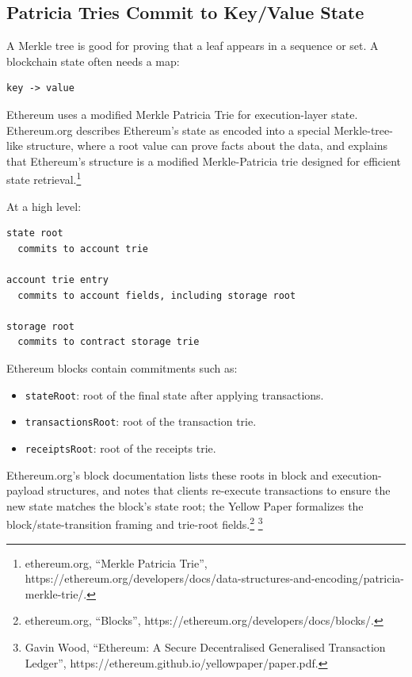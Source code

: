 \subsection{Patricia Tries Commit to Key/Value State}

A Merkle tree is good for proving that a leaf appears in a sequence or
set. A blockchain state often needs a map:

\begin{lstlisting}
key -> value
\end{lstlisting}

Ethereum uses a modified Merkle Patricia Trie for execution-layer state.
Ethereum.org describes Ethereum's state as encoded into a special
Merkle-tree-like structure, where a root value can prove facts about the
data, and explains that Ethereum's structure is a modified
Merkle-Patricia trie designed for efficient state retrieval.\footnote{ethereum.org,
  ``Merkle Patricia Trie'',
  https://ethereum.org/developers/docs/data-structures-and-encoding/patricia-merkle-trie/.}

At a high level:

\begin{lstlisting}
state root
  commits to account trie

account trie entry
  commits to account fields, including storage root

storage root
  commits to contract storage trie
\end{lstlisting}

Ethereum blocks contain commitments such as:

\begin{itemize}
\tightlist
\item
  \passthrough{\lstinline!stateRoot!}: root of the final state after
  applying transactions.
\item
  \passthrough{\lstinline!transactionsRoot!}: root of the transaction
  trie.
\item
  \passthrough{\lstinline!receiptsRoot!}: root of the receipts trie.
\end{itemize}

Ethereum.org's block documentation lists these roots in block and
execution-payload structures, and notes that clients re-execute
transactions to ensure the new state matches the block's state root; the
Yellow Paper formalizes the block/state-transition framing and trie-root
fields.\footnote{ethereum.org, ``Blocks'',
  https://ethereum.org/developers/docs/blocks/.} \footnote{Gavin Wood,
  ``Ethereum: A Secure Decentralised Generalised Transaction Ledger'',
  https://ethereum.github.io/yellowpaper/paper.pdf.}

